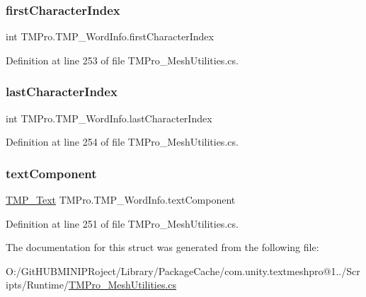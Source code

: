 \mbox{\label{struct_t_m_pro_1_1_t_m_p___word_info_a90c0f4fe19fdda6f9159dc2917bee776}} 
\subsubsection{\texorpdfstring{firstCharacterIndex}{firstCharacterIndex}}
{\footnotesize\ttfamily int T\+M\+Pro.\+T\+M\+P\+\_\+\+Word\+Info.\+first\+Character\+Index}



Definition at line 253 of file T\+M\+Pro\+\_\+\+Mesh\+Utilities.\+cs.

\mbox{\label{struct_t_m_pro_1_1_t_m_p___word_info_a34962a75f3d6228e01eea0f1c076d439}} 
\subsubsection{\texorpdfstring{lastCharacterIndex}{lastCharacterIndex}}
{\footnotesize\ttfamily int T\+M\+Pro.\+T\+M\+P\+\_\+\+Word\+Info.\+last\+Character\+Index}



Definition at line 254 of file T\+M\+Pro\+\_\+\+Mesh\+Utilities.\+cs.

\mbox{\label{struct_t_m_pro_1_1_t_m_p___word_info_a5e83201afcc22882ca9131b1a3868d29}} 
\subsubsection{\texorpdfstring{textComponent}{textComponent}}
{\footnotesize\ttfamily \mbox{\hyperlink{class_t_m_pro_1_1_t_m_p___text}{T\+M\+P\+\_\+\+Text}} T\+M\+Pro.\+T\+M\+P\+\_\+\+Word\+Info.\+text\+Component}



Definition at line 251 of file T\+M\+Pro\+\_\+\+Mesh\+Utilities.\+cs.



The documentation for this struct was generated from the following file\+:\begin{DoxyCompactItemize}
\item 
O\+:/\+Git\+H\+U\+B\+M\+I\+N\+I\+P\+Roject/\+Library/\+Package\+Cache/com.\+unity.\+textmeshpro@1../\+Scripts/\+Runtime/\mbox{\hyperlink{_t_m_pro___mesh_utilities_8cs}{T\+M\+Pro\+\_\+\+Mesh\+Utilities.\+cs}}\end{DoxyCompactItemize}
